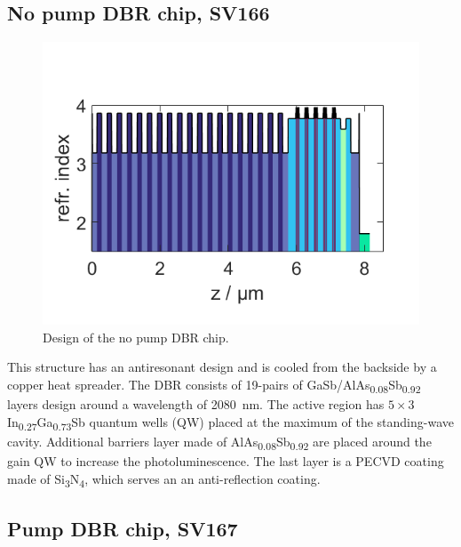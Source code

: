 \subsection*{No pump DBR chip, SV166}

\begin{figure}
    \vspace{-\baselineskip}
    \centering
    \includegraphics[width=.98\textwidth]{images/1SV166.lay.png}
    \caption{Design of the no pump DBR chip.}
    \label{fig:sv166}
\end{figure}

This structure has an antiresonant design and is cooled from the backside by a copper heat spreader. The DBR consists of 19-pairs of GaSb/AlAs\textsubscript{0.08}Sb\textsubscript{0.92} layers design around a wavelength of \qty{2080}{nm}. The active region has $5\times3$ In\textsubscript{0.27}Ga\textsubscript{0.73}Sb quantum wells (QW) placed at the maximum of the standing-wave cavity. Additional barriers layer made of AlAs\textsubscript{0.08}Sb\textsubscript{0.92} are placed around the gain QW to increase the photoluminescence. The last layer is a PECVD coating made of Si\textsubscript{3}N\textsubscript{4}, which serves an an anti-reflection coating.


\subsection*{Pump DBR chip, SV167}

